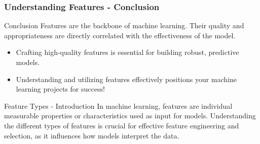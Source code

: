 \documentclass[aspectratio=169]{beamer}
\begin{document}
\begin{frame}[fragile]
    \frametitle{Understanding Features - Conclusion}
    \begin{block}{Conclusion}
        Features are the backbone of machine learning. Their quality and appropriateness are directly correlated with the effectiveness of the model.
    \end{block}
    \begin{itemize}
        \item Crafting high-quality features is essential for building robust, predictive models.
        \item Understanding and utilizing features effectively positions your machine learning projects for success! 
    \end{itemize}
\end{frame}

\begin{frame}[fragile]{Feature Types - Introduction}
    In machine learning, features are individual measurable properties or characteristics used as input for models. Understanding the different types of features is crucial for effective feature engineering and selection, as it influences how models interpret the data.
\end{frame}
\end{document}
